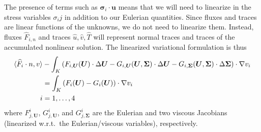 The presence of terms such as $\boldsymbol \sigma_i \cdot \boldsymbol u$ means that we will need to linearize in the stress variables $\sigma_ij$ in addition to our Eulerian quantities. Since fluxes and traces are linear functions of the unknowns, we do not need to linearize them. Instead, fluxes $\widehat{F}_{i,n}$ and traces $\widehat{u},\widehat{v},\widehat{T}$ will represent normal traces and traces of the accumulated nonlinear solution. The linearized variational formulation is thus
\begin{align*}
\langle \widehat{F}_i\cdot n, v\rangle &- \int_K  \left(F_{i,\boldsymbol U}(\boldsymbol U)\cdot \Delta \boldsymbol U -G_{i,\boldsymbol U}(\boldsymbol U, \boldsymbol \Sigma)\cdot \Delta \boldsymbol U - G_{i,\boldsymbol \Sigma}(\boldsymbol U, \boldsymbol \Sigma)\cdot \Delta \boldsymbol \Sigma \right)\cdot \grad v_i \\
&= \int_K  \left(F_i(\boldsymbol U)-G_i(\boldsymbol U)\right) \cdot \grad v_i \\
\qquad i &= 1,\ldots, 4
\end{align*}
where $F^i_{j,\boldsymbol U}$, $G^i_{j,\boldsymbol U}$, and $G^i_{j,\boldsymbol \Sigma}$ are the Eulerian and two viscous Jacobians (linearized w.r.t.\ the Eulerian/viscous variables), respectively.
